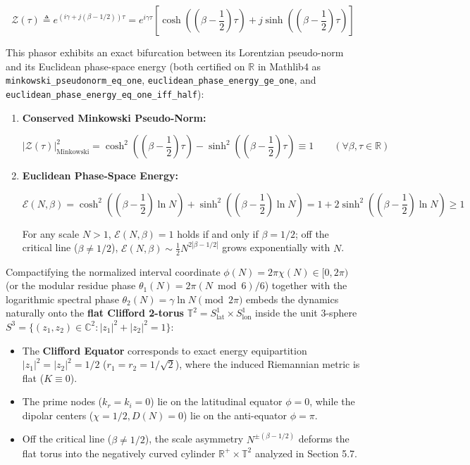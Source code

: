 \documentclass[
  11pt,
]{article}
\providecommand{\tightlist}{%
  \setlength{\itemsep}{0pt}\setlength{\parskip}{0pt}}
\begin{document}
\[\mathcal{Z}(\tau) \triangleq e^{(i\gamma + j(\beta - 1/2))\tau} = e^{i\gamma \tau} \left[ \cosh\left(\left(\beta - \frac{1}{2}\right)\tau\right) + j \sinh\left(\left(\beta - \frac{1}{2}\right)\tau\right) \right]\]

This phasor exhibits an exact bifurcation between its Lorentzian
pseudo-norm and its Euclidean phase-space energy (both certified on
\(\mathbb{R}\) in Mathlib4 as \texttt{minkowski\_pseudonorm\_eq\_one},
\texttt{euclidean\_phase\_energy\_ge\_one}, and
\texttt{euclidean\_phase\_energy\_eq\_one\_iff\_half}):

\begin{enumerate}
\def\labelenumi{\arabic{enumi}.}
\item
  \textbf{Conserved Minkowski Pseudo-Norm:}

  \[|\mathcal{Z}(\tau)|^2_{\text{Minkowski}} = \cosh^2\left(\left(\beta - \frac{1}{2}\right)\tau\right) - \sinh^2\left(\left(\beta - \frac{1}{2}\right)\tau\right) \equiv 1 \qquad (\forall \beta, \tau \in \mathbb{R})\]
\item
  \textbf{Euclidean Phase-Space Energy:}

  \[\mathcal{E}(N, \beta) = \cosh^2\left(\left(\beta - \frac{1}{2}\right)\ln N\right) + \sinh^2\left(\left(\beta - \frac{1}{2}\right)\ln N\right) = 1 + 2\sinh^2\left(\left(\beta - \frac{1}{2}\right)\ln N\right) \ge 1\]

  For any scale \(N > 1\), \(\mathcal{E}(N, \beta) = 1\) holds if and
  only if \(\beta = 1/2\); off the critical line (\(\beta \neq 1/2\)),
  \(\mathcal{E}(N, \beta) \sim \frac{1}{2}N^{2|\beta - 1/2|}\) grows
  exponentially with \(N\).
\end{enumerate}

Compactifying the normalized interval coordinate
\(\phi(N) = 2\pi \chi(N) \in [0, 2\pi)\) (or the modular residue phase
\(\theta_1(N) = 2\pi(N \bmod 6)/6\)) together with the logarithmic
spectral phase \(\theta_2(N) = \gamma \ln N \pmod{2\pi}\) embeds the
dynamics naturally onto the \textbf{flat Clifford 2-torus}
\(\mathbb{T}^2 = S^1_{\text{lat}} \times S^1_{\text{lon}}\) inside the
unit 3-sphere
\(S^3 = \{(z_1, z_2) \in \mathbb{C}^2 : |z_1|^2 + |z_2|^2 = 1\}\):

\begin{itemize}
\tightlist
\item
  The \textbf{Clifford Equator} corresponds to exact energy
  equipartition \(|z_1|^2 = |z_2|^2 = 1/2\)
  (\(r_1 = r_2 = 1/\sqrt{2}\)), where the induced Riemannian metric is
  flat (\(K \equiv 0\)).
\item
  The prime nodes (\(k_r = k_i = 0\)) lie on the latitudinal equator
  \(\phi = 0\), while the dipolar centers (\(\chi = 1/2, D(N) = 0\)) lie
  on the anti-equator \(\phi = \pi\).
\item
  Off the critical line (\(\beta \neq 1/2\)), the scale asymmetry
  \(N^{\pm(\beta - 1/2)}\) deforms the flat torus into the negatively
  curved cylinder \(\mathbb{R}^+ \times \mathbb{T}^2\) analyzed in
  Section 5.7.
\end{itemize}
\end{document}
